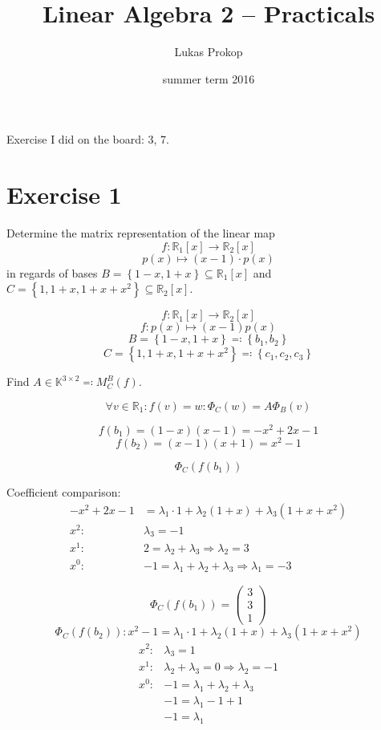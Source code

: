 \documentclass[a4paper]{article}
\title{Linear Algebra 2 -- Practicals}
\author{Lukas Prokop}
\date{summer term 2016}
\theoremstyle{definition}
\newcommand\set[1]{\left\{#1\right\}}
\begin{document}
\maketitle
\tableofcontents

\clearpage
Exercise I did on the board: 3, 7.

\section{Exercise 1}
\begin{ex}
  Determine the matrix representation of the linear map
  \[ f: \mathbb R_1[x] \to \mathbb R_2[x] \]
  \[ p(x) \mapsto (x-1) \cdot p(x) \]
  in regards of bases $B = \set{1-x, 1+x} \subseteq \mathbb R_1[x]$ and $C = \set{1, 1 + x, 1 + x + x^2} \subseteq \mathbb R_2[x]$.
\end{ex}

\[
  f: \mathbb R_1[x] \to \mathbb R_2[x]
\] \[
  f: p(x) \mapsto (x-1) p(x)
\] \[
  B = \set{1-x, 1+x} \eqqcolon \set{b_1, b_2}
\] \[
  C = \set{1, 1+x, 1+x+x^2} \eqqcolon \set{c_1, c_2, c_3}
\]

Find $A \in \mathbb K^{3\times 2} \eqqcolon M_C^B(f)$.

\[ \forall v \in \mathbb R_1: f(v) = w : \Phi_C(w) = A \Phi_B(v) \]

\[ f(b_1) = (1-x)(x-1) = -x^2 + 2x - 1 \]
\[ f(b_2) = (x-1)(x+1) = x^2 - 1 \]

\[ \Phi_C(f(b_1)) \]

Coefficient comparison:
\begin{align*}
  -x^2 + 2x - 1 &= \lambda_1 \cdot 1 + \lambda_2 (1 + x) + \lambda_3 (1 + x + x^2) \\
  x^2: & \lambda_3 = -1 \\
  x^1: & 2 = \lambda_2 + \lambda_3 \Rightarrow \lambda_2 = 3 \\
  x^0: & -1 = \lambda_1 + \lambda_2 + \lambda_3 \Rightarrow \lambda_1 = -3
\end{align*}

\[ \Phi_C(f(b_1)) = \begin{pmatrix} 3 \\ 3 \\ 1 \end{pmatrix} \]
\[ \Phi_C(f(b_2)): x^2 - 1 = \lambda_1 \cdot 1 + \lambda_2 (1 + x) + \lambda_3 (1 + x + x^2) \]
\begin{align*}
  x^2: & \lambda_3 = 1 \\
  x^1: & \lambda_2 + \lambda_3 = 0 \Rightarrow \lambda_2 = -1 \\
  x^0: & -1 = \lambda_1 + \lambda_2 + \lambda_3 \\
       & -1 = \lambda_1 - 1 + 1 \\
       & -1 = \lambda_1
\end{align*}
\end{document}
